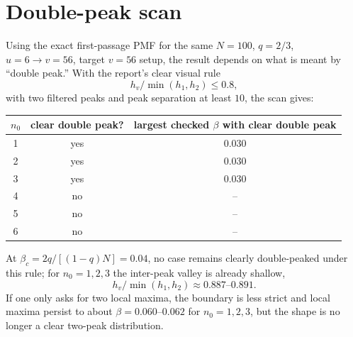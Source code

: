 \documentclass[11pt]{article}
\begin{document}
\section*{Double-peak scan}

Using the exact first-passage PMF for the same \(N=100\), \(q=2/3\),
\(u=6\to v=56\), target \(v=56\) setup, the result depends on what is meant by
``double peak.'' With the report's clear visual rule
\[
  h_v/\min(h_1,h_2)\leq 0.8,
\]
with two filtered peaks and peak separation at least \(10\), the scan gives:

\begin{center}
\begin{tabular}{ccc}
\toprule
\(n_0\) & clear double peak? & largest checked \(\beta\) with clear double peak \\
\midrule
1 & yes & 0.030 \\
2 & yes & 0.030 \\
3 & yes & 0.030 \\
4 & no & -- \\
5 & no & -- \\
6 & no & -- \\
\bottomrule
\end{tabular}
\end{center}

At \(\beta_c=2q/[(1-q)N]=0.04\), no case remains clearly double-peaked under
this rule; for \(n_0=1,2,3\) the inter-peak valley is already shallow,
\[
  h_v/\min(h_1,h_2)\approx 0.887\text{--}0.891.
\]
If one only asks for two local maxima, the boundary is less strict and local
maxima persist to about \(\beta=0.060\)--\(0.062\) for \(n_0=1,2,3\), but the
shape is no longer a clear two-peak distribution.
\end{document}
